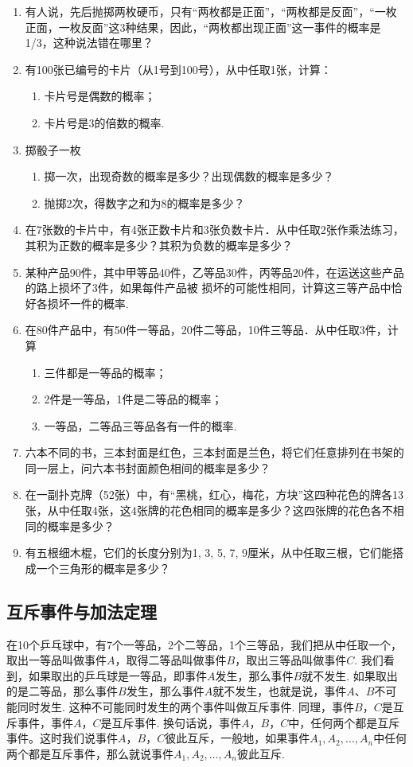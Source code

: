 \begin{ex}
\begin{enumerate}
\item 有人说，先后抛掷两枚硬币，只有“两枚都是正面”，“两枚都是反面”，“一枚正面，一枚反面”这3种结果，因此，“两枚都出现正面”这一事件的概率是1/3，这种说法错在哪里？
\item 有100张已编号的卡片（从1号到100号），从中任取1张，计算：
\begin{enumerate}[(1)]
    \item 卡片号是偶数的概率；    \item 卡片号是3的倍数的概率.
\end{enumerate}
\item 掷骰子一枚
\begin{enumerate}[(1)]
\item 掷一次，出现奇数的概率是多少？出现偶数的概率是多少？
\item 抛掷2次，得数字之和为8的概率是多少？
\end{enumerate}
\item 在7张数的卡片中，有4张正数卡片和3张负数卡片．从中任取2张作乘法练习，其积为正数的概率是多少？其积为负数的概率是多少？
\item 某种产品90件，其中甲等品40件，乙等品30件，丙等品20件，在运送这些产品的路上损坏了3件，如果每件产品被
损坏的可能性相同，计算这三等产品中恰好各损坏一件的概率.
\item 在80件产品中，有50件一等品，20件二等品，10件三等品．从中任取3件，计算
\begin{enumerate}[(1)]
\item 三件都是一等品的概率；    \item 2件是一等品，1件是二等品的概率；    \item 一等品，二等品三等品各有一件的概率.
\end{enumerate}

\item 六本不同的书，三本封面是红色，三本封面是兰色，将它们任意排列在书架的同一层上，问六本书封面颜色相间的概率是多少？
\item 在一副扑克牌（52张）中，有“黑桃，红心，梅花，方块”这四种花色的牌各13张，从中任取4张，这4张牌的花色相同的概率是多少？这四张牌的花色各不相同的概率是多少？
\item 有五根细木棍，它们的长度分别为1, 3, 5, 7, 9厘米，从中任取三根，它们能搭成一个三角形的概率是多少？
\end{enumerate}
\end{ex}

\subsection{互斥事件与加法定理}
在10个乒乓球中，有7个一等品，2个二等品，1个三等品，我们把从中任取一个，取出一等品叫做事件$A$，取得二等品叫做事件$B$，取出三等品叫做事件$C$. 我们看到，如果取出的乒乓球是一等品，即事件$A$发生，那么事件$B$就不发生. 如果取出的是二等品，那么事件$B$发生，那么事件$A$就不发生，也就是说，事件$A$、$B$不可能同时发生. 这种不可能同时发生的两个事件叫做互斥事件. 同理，事件$B$，$C$是互斥事件，事件$A$，$C$是互斥事件. 换句话说，事件$A$，$B$，$C$中，任何两个都是互斥事件。这时我们说事件$A$，$B$，$C$彼此互斥，一般地，如果事件$A_1,A_2,\ldots,A_n$中任何两个都是互斥事件，那么就说事件$A_1,A_2,\ldots,A_n$彼此互斥.

